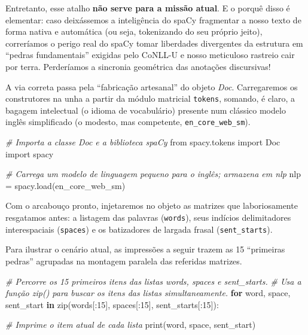 \documentclass[
  brazilian,
]{article}
\newenvironment{Shaded}{}{}
\newcommand{\BuiltInTok}[1]{#1}
\newcommand{\CommentTok}[1]{\textcolor[rgb]{0.38,0.63,0.69}{\textit{#1}}}
\newcommand{\ControlFlowTok}[1]{\textcolor[rgb]{0.00,0.44,0.13}{\textbf{#1}}}
\newcommand{\DecValTok}[1]{\textcolor[rgb]{0.25,0.63,0.44}{#1}}
\newcommand{\ImportTok}[1]{#1}
\newcommand{\KeywordTok}[1]{\textcolor[rgb]{0.00,0.44,0.13}{\textbf{#1}}}
\newcommand{\NormalTok}[1]{#1}
\newcommand{\OperatorTok}[1]{\textcolor[rgb]{0.40,0.40,0.40}{#1}}
\newcommand{\StringTok}[1]{\textcolor[rgb]{0.25,0.44,0.63}{#1}}
\begin{document}
Entretanto, esse atalho \textbf{não serve para a missão atual}. E o
porquê disso é elementar: caso deixássemos a inteligência do spaCy
fragmentar a nosso texto de forma nativa e automática (ou seja,
tokenizando do seu próprio jeito), correríamos o perigo real do spaCy
tomar liberdades divergentes da estrutura em ``pedras fundamentais''
exigidas pelo CoNLL-U e nosso meticuloso rastreio cair por terra.
Perderíamos a sincronia geométrica das anotações discursivas!

A via correta passa pela ``fabricação artesanal'' do objeto \emph{Doc}.
Carregaremos os construtores na unha a partir da módulo matricial
\texttt{tokens}, somando, é claro, a bagagem intelectual (o idioma de
vocabulário) presente num clássico modelo inglês simplificado (o
modesto, mas competente, \texttt{en\_core\_web\_sm}).

\begin{Shaded}
\begin{Highlighting}[]
\CommentTok{\# Importa a classe Doc e a biblioteca spaCy}
\ImportTok{from}\NormalTok{ spacy.tokens }\ImportTok{import}\NormalTok{ Doc}
\ImportTok{import}\NormalTok{ spacy}

\CommentTok{\# Carrega um modelo de linguagem pequeno para o inglês; armazena em \textquotesingle{}nlp\textquotesingle{}}
\NormalTok{nlp }\OperatorTok{=}\NormalTok{ spacy.load(}\StringTok{\textquotesingle{}en\_core\_web\_sm\textquotesingle{}}\NormalTok{)}
\end{Highlighting}
\end{Shaded}

Com o arcabouço pronto, injetaremos no objeto as matrizes que
laboriosamente resgatamos antes: a listagem das palavras
(\texttt{words}), seus indícios delimitadores interespaciais
(\texttt{spaces}) e os batizadores de largada frasal
(\texttt{sent\_starts}).

Para ilustrar o cenário atual, as impressões a seguir trazem as 15
``primeiras pedras'' agrupadas na montagem paralela das referidas
matrizes.

\begin{Shaded}
\begin{Highlighting}[]
\CommentTok{\# Percorre os 15 primeiros itens das listas \textquotesingle{}words\textquotesingle{}, \textquotesingle{}spaces\textquotesingle{} e \textquotesingle{}sent\_starts\textquotesingle{}.}
\CommentTok{\# Usa a função zip() para buscar os itens das listas simultaneamente.}
\ControlFlowTok{for}\NormalTok{ word, space, sent\_start }\KeywordTok{in} \BuiltInTok{zip}\NormalTok{(words[:}\DecValTok{15}\NormalTok{], spaces[:}\DecValTok{15}\NormalTok{], sent\_starts[:}\DecValTok{15}\NormalTok{]):}
    
    \CommentTok{\# Imprime o item atual de cada lista}
    \BuiltInTok{print}\NormalTok{(word, space, sent\_start)}
\end{Highlighting}
\end{Shaded}
\end{document}
